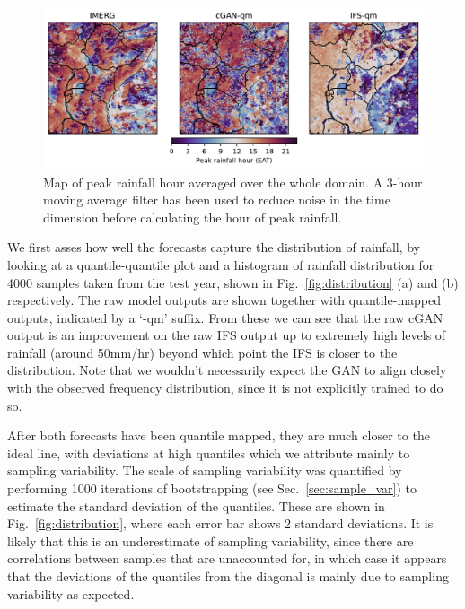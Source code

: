 \documentclass{article}
\begin{document}
\begin{figure}[t]
\centering
\begin{subcaptionblock}{\textwidth}
        \centering
        \includegraphics[width=\textwidth]{images/diurnal_cycle_map_All_final-nologs_217600.pdf}
        \caption{}\label{}
    \end{subcaptionblock}%
    \hfill
     \caption{Map of peak rainfall hour averaged over the whole domain. A 3-hour moving average filter has been used to reduce noise in the time dimension before calculating the hour of peak rainfall.}
     \label{fig:peak_hour}
\end{figure}

 We first asses how well the forecasts capture the distribution of rainfall, by looking at a quantile-quantile plot and a histogram of rainfall distribution for 4000 samples taken from the test year, shown in Fig.~\ref{fig:distribution} (a) and (b) respectively. The raw model outputs are shown together with quantile-mapped outputs, indicated by a `-qm' suffix. From these we can see that the raw cGAN output is an improvement on the raw IFS output up to extremely high levels of rainfall (around 50mm/hr) beyond which point the IFS is closer to the distribution. Note that we wouldn't necessarily expect the GAN to align closely with the observed frequency distribution, since it is not explicitly trained to do so.

After both forecasts have been quantile mapped, they are much closer to the ideal line, with deviations at high quantiles which we attribute mainly to sampling variability. The scale of sampling variability was quantified by performing 1000 iterations of bootstrapping (see Sec.~\ref{sec:sample_var}) to estimate the standard deviation of the quantiles. These are shown in Fig.~\ref{fig:distribution}, where each error bar shows 2 standard deviations. It is likely that this is an underestimate of sampling variability, since there are correlations between samples that are unaccounted for, in which case it appears that the deviations of the quantiles from the diagonal is mainly due to sampling variability as expected. 
\end{document}
